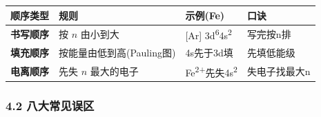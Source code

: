 {\def\LTcaptype{none} %
\begin{longtable}[]{@{}
  >{\raggedright\arraybackslash}p{}
  >{\raggedright\arraybackslash}p{}
  >{\raggedright\arraybackslash}p{}
  >{\raggedleft\arraybackslash}p{}@{}}
\toprule\noalign{}
\begin{minipage}[b]{\linewidth}\raggedright
顺序类型
\end{minipage} & \begin{minipage}[b]{\linewidth}\raggedright
规则
\end{minipage} & \begin{minipage}[b]{\linewidth}\raggedright
示例(Fe)
\end{minipage} & \begin{minipage}[b]{\linewidth}\raggedleft
口诀
\end{minipage} \\
\midrule\noalign{}
\endhead
\bottomrule\noalign{}
\endlastfoot
\textbf{书写顺序} & 按 \(n\) 由小到大 & {[}Ar{]} 3d\textsuperscript{6}4s\textsuperscript{2} & 写完按n排 \\
\textbf{填充顺序} & 按能量由低到高(Pauling图) & 4s先于3d填 & 先填低能级 \\
\textbf{电离顺序} & 先失 \(n\) 最大的电子 & Fe\textsuperscript{2+}先失4s\textsuperscript{2} & 失电子找最大n \\
\end{longtable}
}

\subsubsection{4.2 八大常见误区}\label{ux516bux5927ux5e38ux89c1ux8befux533a}

